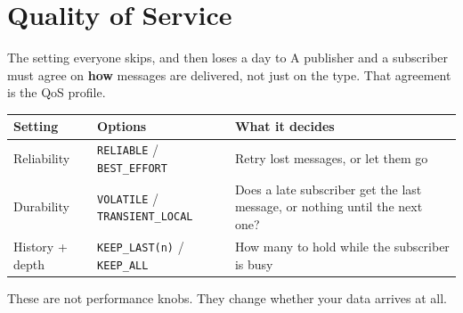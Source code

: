 \documentclass[aspectratio=169]{beamer}
\begin{document}
\section{Quality of Service}

\begin{frame}{The setting everyone skips, and then loses a day to}
  \small
  A publisher and a subscriber must agree on \textbf{how} messages are delivered, not just on
  the type. That agreement is the QoS profile.

  \vspace{0.6em}
  \begin{center}
  \begin{tabular}{@{}p{2.4cm}p{4.0cm}p{4.4cm}@{}}
    \toprule
    \textbf{Setting} & \textbf{Options} & \textbf{What it decides} \\
    \midrule
    Reliability & \texttt{RELIABLE} / \texttt{BEST\_EFFORT}
      & Retry lost messages, or let them go \\[0.3em]
    Durability & \texttt{VOLATILE} / \texttt{TRANSIENT\_LOCAL}
      & Does a late subscriber get the last message, or nothing until the next one? \\[0.3em]
    History + depth & \texttt{KEEP\_LAST(n)} / \texttt{KEEP\_ALL}
      & How many to hold while the subscriber is busy \\
    \bottomrule
  \end{tabular}
  \end{center}

  \vspace{0.5em}
  \footnotesize These are not performance knobs. They change whether your data arrives at all.
\end{frame}
\end{document}
